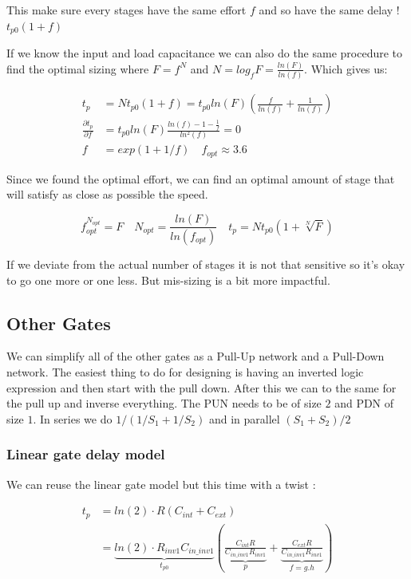 \documentclass{report}
\begin{document}
This make sure every stages have the same effort $f$ and so have the same delay ! $t_{p0}(1+f)$

If we know the input and load capacitance we can also do the same procedure to find the optimal sizing where $F = f^N$ and $N = log_f F = \frac{ln(F)}{ln(f)}$. Which gives us:

\begin{align}
    t_p &= Nt_{p0}(1+f) = t_{p0} ln(F)\left( \frac{f}{ln(f)} + \frac{1}{ln(f)} \right)\\
    \frac{\partial t_p}{\partial f} &= t_{p0} ln(F) \frac{ln(f) - 1 - \frac{1}{f}}{ln^2(f)} = 0\\
    f &= exp(1 + 1/f) \quad f_{opt} \approx 3.6
\end{align}

Since we found the optimal effort, we can find an optimal amount of stage that will satisfy as close as possible the speed. 

\begin{equation}
    f_{opt}^{N_{opt}} = F \quad N_{opt} = \frac{ln(F)}{ln(f_{opt})} \quad t_p = Nt_{p0} (1+\sqrt[N]{F})
\end{equation}

If we deviate from the actual number of stages it is not that sensitive so it's okay to go one more or one less. But mis-sizing is a bit more impactful.

\subsection{Other Gates}

We can simplify all of the other gates as a Pull-Up network and a Pull-Down network. The easiest thing to do for designing is having an inverted logic expression and then start with the pull down. After this we can to the same for the pull up and inverse everything. The PUN needs to be of size $2$ and PDN of size $1$. In series we do $1/(1/S_1+1/S_2)$ and in parallel $(S_1+S_2)/2$

\subsubsection{Linear gate delay model}

We can reuse the linear gate model but this time with a twist : 

\begin{align}
    t_p &= ln(2) \cdot R(C_{int} + C_{ext})\\
    &= \underbrace{ln(2) \cdot R_{inv1} C_{in\_inv1}}_{t_{p0}} \left( \underbrace{\frac{C_{int} R}{C_{in\_inv1} R_{inv1}}}_{p} +  \underbrace{\frac{C_{ext} R}{C_{in\_inv1} R_{inv1}}}_{f=g.h}\right)
\end{align}
\end{document}
